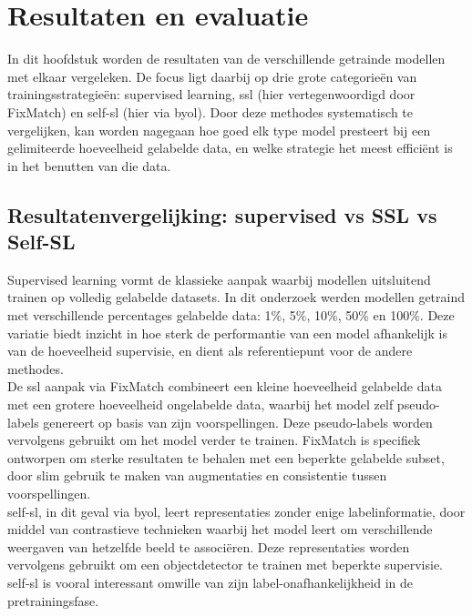 \chapter{Resultaten en evaluatie}
\label{ch:resultaten-evaluatie}

In dit hoofdstuk worden de resultaten van de verschillende getrainde modellen met elkaar vergeleken. De focus ligt daarbij op drie grote categorieën van trainingsstrategieën: supervised learning, \gls{ssl} (hier vertegenwoordigd door FixMatch) en \gls{self-sl} (hier via \gls{byol}). Door deze methodes systematisch te vergelijken, kan worden nagegaan hoe goed elk type model presteert bij een gelimiteerde hoeveelheid gelabelde data, en welke strategie het meest efficiënt is in het benutten van die data. \\

\section{Resultatenvergelijking: supervised vs SSL vs Self-SL}

Supervised learning vormt de klassieke aanpak waarbij modellen uitsluitend trainen op volledig gelabelde datasets. In dit onderzoek werden modellen getraind met verschillende percentages gelabelde data: 1\%, 5\%, 10\%, 50\% en 100\%. Deze variatie biedt inzicht in hoe sterk de performantie van een model afhankelijk is van de hoeveelheid supervisie, en dient als referentiepunt voor de andere methodes. \\

De \gls{ssl} aanpak via FixMatch combineert een kleine hoeveelheid gelabelde data met een grotere hoeveelheid ongelabelde data, waarbij het model zelf pseudo-labels genereert op basis van zijn voorspellingen. Deze pseudo-labels worden vervolgens gebruikt om het model verder te trainen. FixMatch is specifiek ontworpen om sterke resultaten te behalen met een beperkte gelabelde subset, door slim gebruik te maken van augmentaties en consistentie tussen voorspellingen. \\

\Gls{self-sl}, in dit geval via \gls{byol}, leert representaties zonder enige labelinformatie, door middel van contrastieve technieken waarbij het model leert om verschillende weergaven van hetzelfde beeld te associëren. Deze representaties worden vervolgens gebruikt om een objectdetector te trainen met beperkte supervisie. \Gls{self-sl} is vooral interessant omwille van zijn label-onafhankelijkheid in de pretrainingsfase. \\

